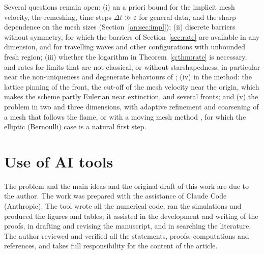 \documentclass[11pt]{amsart}
\theoremstyle{definition}
\theoremstyle{remark}
\newcommand{\ve}{\varepsilon}
\begin{document}
Several questions remain open: (i) an a priori bound for the implicit mesh velocity,
the remeshing, time steps $\Delta t\gg\ve$ for general data, and the sharp dependence on the
mesh sizes (Section~\ref{an:sec:impl});
(ii) discrete barriers without symmetry, for which the barriers of
Section~\ref{sec:rate} are available in any dimension, and for travelling waves and
other configurations with unbounded fresh region; (iii)
whether the logarithm in Theorem~\ref{q:thm:rate} is necessary, and rates for limits that
are not classical, or without starshapedness, in particular near the non-uniqueness and
degenerate behaviours of \cite{PetrosyanYip2008,WeissZhang2009}; (iv) in the method: the
lattice pinning of the front, the cut-off of the mesh velocity near the origin, which
makes the scheme partly Eulerian near extinction, and several fronts; and (v) the
problem in two and three dimensions, with adaptive refinement and coarsening of a mesh
that follows the flame, or with a moving mesh method
\cite{HuangRussell2011}, for which the elliptic (Bernoulli) case
\cite{FlucherRumpf1997,ShenDaiHuang2024} is a natural first step.


\section*{Use of AI tools}

The problem and the main ideas and the original draft of this work are due to the author. The work was prepared
with the assistance of Claude Code (Anthropic). The tool wrote all the numerical code, ran the simulations and produced the figures and tables; it assisted in the development and writing of the proofs, in drafting and
revising the manuscript, and in searching the literature. The author reviewed and
verified all the statements, proofs, computations and references, and takes full
responsibility for the content of the article.



\end{document}
